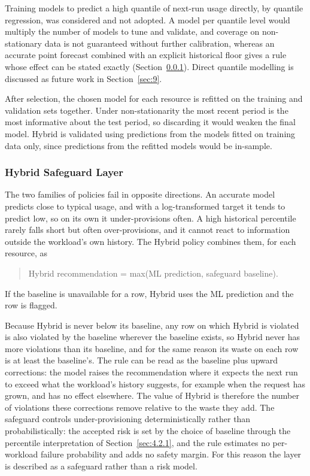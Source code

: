 \documentclass{IEEEtran}
\begin{document}
Training models to predict a high quantile of next-run usage directly, by quantile regression, was considered and not adopted. A model per quantile level would multiply the number of models to tune and validate, and coverage on non-stationary data is not guaranteed without further calibration, whereas an accurate point forecast combined with an explicit historical floor gives a rule whose effect can be stated exactly (Section~\ref{sec:4.2.3}). Direct quantile modelling is discussed as future work in Section~\ref{sec:9}.

After selection, the chosen model for each resource is refitted on the training and validation sets together. Under non-stationarity the most recent period is the most informative about the test period, so discarding it would weaken the final model. Hybrid is validated using predictions from the models fitted on training data only, since predictions from the refitted models would be in-sample.

\subsubsection{Hybrid Safeguard Layer}\label{sec:4.2.3}

The two families of policies fail in opposite directions. An accurate model predicts close to typical usage, and with a log-transformed target it tends to predict low, so on its own it under-provisions often. A high historical percentile rarely falls short but often over-provisions, and it cannot react to information outside the workload's own history. The Hybrid policy combines them, for each resource, as

\begin{quote}
Hybrid recommendation = max(ML prediction, safeguard baseline).
\end{quote}

If the baseline is unavailable for a row, Hybrid uses the ML prediction and the row is flagged.

Because Hybrid is never below its baseline, any row on which Hybrid is violated is also violated by the baseline wherever the baseline exists, so Hybrid never has more violations than its baseline, and for the same reason its waste on each row is at least the baseline's. The rule can be read as the baseline plus upward corrections: the model raises the recommendation where it expects the next run to exceed what the workload's history suggests, for example when the request has grown, and has no effect elsewhere. The value of Hybrid is therefore the number of violations these corrections remove relative to the waste they add. The safeguard controls under-provisioning deterministically rather than probabilistically: the accepted risk is set by the choice of baseline through the percentile interpretation of Section~\ref{sec:4.2.1}, and the rule estimates no per-workload failure probability and adds no safety margin. For this reason the layer is described as a safeguard rather than a risk model.
\end{document}
